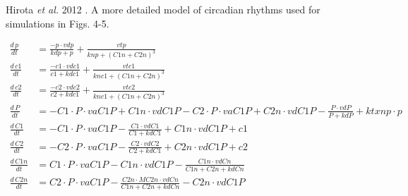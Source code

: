 \documentclass[11pt, letterpaper]{article}
\begin{document}
\begin{model}
\caption{Hirota {\itshape et al.} 2012 \cite{Hirota2012}. A more detailed model
of circadian rhythms used for simulations in Figs. 4-5.}
  \centering
\begin{align*}
\frac{d\,\mathit{p}}{dt} &= \frac{- \mathit{p} \cdot \mathit{vdp}}{\mathit{kdp} + \mathit{p}} + \frac{\mathit{vtp}}{\mathit{knp} + \left(\mathit{C1n} + \mathit{C2n}\right)^{3}}\\
\frac{d\,\mathit{c1}}{dt} &= \frac{- \mathit{c1} \cdot \mathit{vdc1}}{\mathit{c1} + \mathit{kdc1}} + \frac{\mathit{vtc1}}{\mathit{knc1} + \left(\mathit{C1n} + \mathit{C2n}\right)^{3}}\\
\frac{d\,\mathit{c2}}{dt} &= \frac{- \mathit{c2} \cdot \mathit{vdc2}}{\mathit{c2} + \mathit{kdc1}} + \frac{\mathit{vtc2}}{\mathit{knc1} + \left(\mathit{C1n} + \mathit{C2n}\right)^{3}}\\
\frac{d\,\mathit{P}}{dt} &= - \mathit{C1} \cdot \mathit{P} \cdot \mathit{vaC1P} + \mathit{C1n} \cdot \mathit{vdC1P} - \mathit{C2} \cdot \mathit{P} \cdot \mathit{vaC1P} + \mathit{C2n} \cdot \mathit{vdC1P} - \frac{\mathit{P} \cdot \mathit{vdP}}{\mathit{P} + \mathit{kdP}} + \mathit{ktxnp} \cdot \mathit{p}\\
\frac{d\,\mathit{C1}}{dt} &= - \mathit{C1} \cdot \mathit{P} \cdot \mathit{vaC1P} - \frac{\mathit{C1} \cdot \mathit{vdC1}}{\mathit{C1} + \mathit{kdC1}} + \mathit{C1n} \cdot \mathit{vdC1P} + \mathit{c1}\\
\frac{d\,\mathit{C2}}{dt} &= - \mathit{C2} \cdot \mathit{P} \cdot \mathit{vaC1P} - \frac{\mathit{C2} \cdot \mathit{vdC2}}{\mathit{C2} + \mathit{kdC1}} + \mathit{C2n} \cdot \mathit{vdC1P} + \mathit{c2}\\
\frac{d\,\mathit{C1n}}{dt} &= \mathit{C1} \cdot \mathit{P} \cdot \mathit{vaC1P} - \mathit{C1n} \cdot \mathit{vdC1P} - \frac{\mathit{C1n} \cdot \mathit{vdCn}}{\mathit{C1n} + \mathit{C2n} + \mathit{kdCn}}\\
\frac{d\,\mathit{C2n}}{dt} &= \mathit{C2} \cdot \mathit{P} \cdot \mathit{vaC1P} - \frac{\mathit{C2n} \cdot \mathit{MC2n} \cdot \mathit{vdCn}}{\mathit{C1n} + \mathit{C2n} + \mathit{kdCn}} - \mathit{C2n} \cdot \mathit{vdC1P}\\
\end{align*}
  


\end{model}
\end{document}
